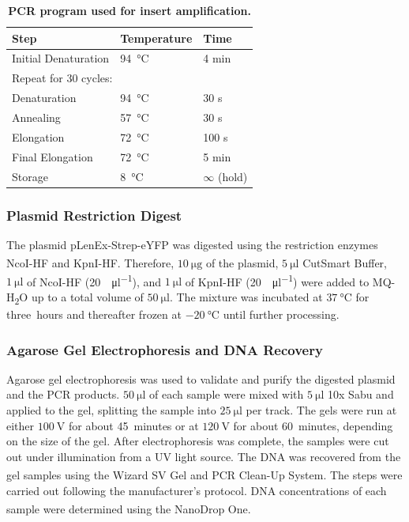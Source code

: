 \begin{table}[ht]
    \centering
    \caption{\textbf{PCR program used for insert amplification.}}
    \label{tab:methods_pcr_cycle}
    \begin{tabular}{lll}
    \toprule
    \textbf{Step} & \textbf{Temperature} & \textbf{Time} \\
    \midrule
    Initial Denaturation     & \SI{94}{\degreeCelsius}  & 4 min   \\[1ex]
    \multicolumn{3}{l}{Repeat for 30 cycles:} \\[1ex]
    \quad Denaturation       & \SI{94}{\degreeCelsius}  & 30 s    \\
    \quad Annealing          & \SI{57}{\degreeCelsius}  & 30 s    \\
    \quad Elongation         & \SI{72}{\degreeCelsius}  & 100 s   \\[1ex]
    Final Elongation         & \SI{72}{\degreeCelsius}  & 5 min   \\
    Storage                  & \SI{8}{\degreeCelsius}   & $\infty$ (hold)  \\
    \bottomrule
    \end{tabular}
\end{table}
\subsubsection{Plasmid Restriction Digest}
The plasmid pLenEx-Strep-eYFP was digested using the restriction enzymes NcoI-HF\textsuperscript{\textregistered} and KpnI-HF\textsuperscript{\textregistered}. Therefore, $\SI{10}{\micro\gram}$ of the plasmid, $\SI{5}{\micro\litre}$ CutSmart\textsuperscript{\textregistered} Buffer, $\SI{1}{\micro\litre}$ of NcoI-HF\textsuperscript{\textregistered} (\SI{20}{\enzymeUnit\per\micro\litre}), and $\SI{1}{\micro\litre}$ of KpnI-HF\textsuperscript{\textregistered} (\SI{20}{\enzymeUnit\per\micro\litre}) were added to MQ-H\textsubscript{2}O up to a total volume of $\SI{50}{\micro\litre}$. The mixture was incubated at $\SI{37}{\degreeCelsius}$ for three~hours and thereafter frozen at $\SI{-20}{\degreeCelsius}$ until further processing. 

\subsubsection{Agarose Gel Electrophoresis and DNA Recovery}
Agarose gel electrophoresis was used to validate and purify the digested plasmid and the PCR products. $\SI{50}{\micro\litre}$ of each sample were mixed with $\SI{5}{\micro\litre}$ 10x Sabu and applied to the gel, splitting the sample into $\SI{25}{\micro\litre}$ per track. The gels were run at either $\SI{100}{\volt}$ for about 45~minutes or at $\SI{120}{\volt}$ for about 60~minutes, depending on the size of the gel. After electrophoresis was complete, the samples were cut out under illumination from a UV light source. The DNA was recovered from the gel samples using the Wizard\textsuperscript{\textregistered} SV Gel and PCR Clean-Up System. The steps were carried out following the manufacturer's protocol. DNA concentrations of each sample were determined using the NanoDrop\textsuperscript{\texttrademark} One.

